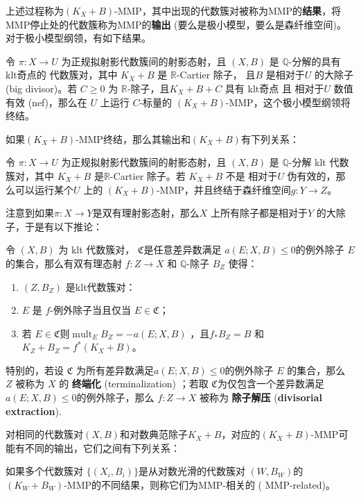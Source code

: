 上述过程称为$(K_{X}+B)$-MMP，其中出现的代数簇对被称为MMP的\textbf{结果}，将MMP停止处的代数簇称为MMP的\textbf{输出} (要么是极小模型，要么是森纤维空间)。对于极小模型纲领，有如下结果。
\begin{theorem}[标量MMP的终结定理]
  \cite[Corollary 1.4.2]{BCHM10} 令 $ \pi: X\to U $ 为正规拟射影代数簇间的射影态射，且 $(X, B)$ 是  $\mathbb{Q}$-分解的具有 klt奇点的 代数簇对，其中 $K_{X}+B$ 是 $\mathbb{R}$-Cartier 除子， 且$B$ 是相对于$U$ 的大除子 (big divisor)。若 $C\geqslant0$ 为 $\mathbb{R}$-除子，且$K_{X}+B+C$ 具有 klt奇点 且 相对于$U$ 数值有效 (nef)，那么在 $U$ 上运行 $C$-标量的  $(K_{X}+B)$-MMP，这个极小模型纲领将终结。
\end{theorem}

如果$(K_{X}+B)$-MMP终结，那么其输出和$(K_{X}+B)$有下列关系：
\begin{theorem}[极小模型输出]\label{notpseudoeffmfs}
  \cite[Corollary 1.3.3]{BCHM10} 令 $ \pi: X\to U $ 为正规拟射影代数簇间的射影态射，且 $(X, B)$ 是 $\mathbb{Q}$-分解 klt 代数簇对，其中 $K_{X}+B$ 是$\mathbb{R}$-Cartier 除子。若 $K_{X}+B$ 不是 相对于$U$ 伪有效的，那么可以运行某个$U$ 上的  $(K_{X}+B)$-MMP，并且终结于森纤维空间$g:Y\to Z$。
\end{theorem}
注意到如果$ \pi:X \to Y$是双有理射影态射，那么$X$ 上所有除子都是相对于$Y$ 的大除子，于是有以下推论：   
\begin{corollary}\label{extraction}
  \cite[Corollary 13.7]{haconMinimalModelProgram2012} 令 $ (X,B) $ 为 klt 代数簇对， $\mathfrak{C}$是任意差异数满足 $ a(E;X,B)\leqslant 0 $的例外除子 $E$ 的集合，那么有双有理态射 $ f:Z\to X $ 和 $ \mathbb{Q} $-除子 $ B_Z $ 使得：
  \begin{enumerate}
    \item $ (Z,B_Z) $ 是klt代数簇对：
    \item $ E $ 是 $f$-例外除子当且仅当 $ E\in \mathfrak{C} $；
    \item  若 $E \in \mathfrak{C}$则$ \operatorname{mult}_{E}B_Z=-a(E;X,B) $ ，且$ f_*B_Z=B $ 和 $ K_Z+B_Z=f^*(K_X+B) $。
  \end{enumerate}
  特别的，若设 $\mathfrak{C}$ 为所有差异数满足$a(E; X, B)\leqslant 0$的例外除子 $E$ 的集合，那么 $ Z $ 被称为 $X$ 的 \textbf{终端化} (terminalization) ；若取 $\mathfrak{C}$为仅包含一个差异数满足 $a(E; X, B)\leqslant 0$的例外除子，那么 $ f: Z\to X $ 被称为 \textbf{除子解压} (\textbf{divisorial extraction}).
\end{corollary}
对相同的代数簇对$(X,B)$和对数典范除子$K_{X}+B$，对应的$(K_{X}+B)$-MMP可能有不同的输出，它们之间有下列关系：
\begin{definition}
  \cite[Definition 3.3]{brunoLogSarkisovProgram1995}
  如果多个代数簇对 $ \{(X_i,B_i)\} $是从对数光滑的代数簇对 $(W,B_{W})$的 $(K_{W}+B_{W}) $-MMP的不同结果，则称它们为MMP-相关的 ( MMP-related)。 
\end{definition}

